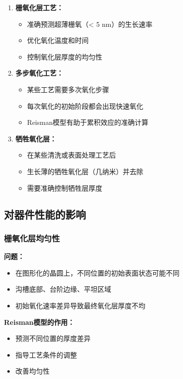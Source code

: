 \documentclass[UTF8,12pt,a4paper]{ctexart}
\begin{document}
\begin{enumerate}
    \item \textbf{栅氧化层工艺：}
    \begin{itemize}
        \item 准确预测超薄栅氧（< 5 nm）的生长速率
        \item 优化氧化温度和时间
        \item 控制氧化层厚度的均匀性
    \end{itemize}
    
    \item \textbf{多步氧化工艺：}
    \begin{itemize}
        \item 某些工艺需要多次氧化步骤
        \item 每次氧化的初始阶段都会出现快速氧化
        \item Reisman模型有助于累积效应的准确计算
    \end{itemize}
    
    \item \textbf{牺牲氧化层：}
    \begin{itemize}
        \item 在某些清洗或表面处理工艺后
        \item 生长薄的牺牲氧化层（几纳米）并去除
        \item 需要准确控制牺牲层厚度
    \end{itemize}
\end{enumerate}

\subsection{对器件性能的影响}

\subsubsection{栅氧化层均匀性}

\textbf{问题：}
\begin{itemize}
    \item 在图形化的晶圆上，不同位置的初始表面状态可能不同
    \item 沟槽底部、台阶边缘、平坦区域
    \item 初始氧化速率差异导致最终氧化层厚度不均
\end{itemize}

\textbf{Reisman模型的作用：}
\begin{itemize}
    \item 预测不同位置的厚度差异
    \item 指导工艺条件的调整
    \item 改善均匀性
\end{itemize}
\end{document}
